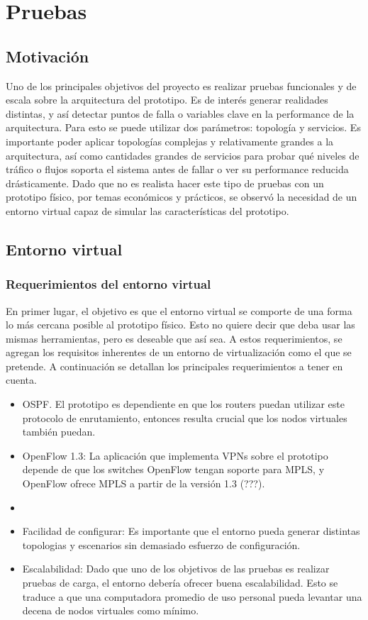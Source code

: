 \documentclass[a4paper,12pt]{report}
\begin{document}
\tableofcontents
\chapter{Pruebas}
\section{Motivación}
Uno de los principales objetivos del proyecto es realizar pruebas funcionales y de escala sobre la arquitectura del prototipo. Es de interés generar realidades distintas, y así detectar puntos de falla o variables clave en la performance de la arquitectura. Para esto se puede utilizar dos parámetros: topología y servicios. Es importante poder aplicar topologías complejas y relativamente grandes a la arquitectura, así como cantidades grandes de servicios para probar qué niveles de tráfico o flujos soporta el sistema antes de fallar o ver su performance reducida drásticamente. Dado que no es realista hacer este tipo de pruebas con un prototipo físico, por temas económicos y prácticos, se observó la necesidad de un entorno virtual capaz de simular las características del prototipo.

\section{Entorno virtual}
\subsection{Requerimientos del entorno virtual}
En primer lugar, el objetivo es que el entorno virtual se comporte de una forma lo más cercana posible al prototipo físico. Esto no quiere decir que deba usar las mismas herramientas, pero es deseable que así sea. A estos requerimientos, se agregan los requisitos inherentes de un entorno de virtualización como el que se pretende. A continuación se detallan los principales requerimientos a tener en cuenta.
\begin{itemize} 
	\item OSPF. El prototipo es dependiente en que los routers puedan utilizar este protocolo de enrutamiento, entonces resulta crucial que los nodos virtuales también puedan.
	\item OpenFlow 1.3: La aplicación que implementa VPNs sobre el prototipo depende de que los switches OpenFlow tengan soporte para MPLS, y OpenFlow ofrece MPLS a partir de la versión 1.3 (???).
	\item 
	\item Facilidad de configurar: Es importante que el entorno pueda generar distintas topologias y escenarios sin demasiado esfuerzo de configuración.
	\item Escalabilidad: Dado que uno de los objetivos de las pruebas es realizar pruebas de carga, el entorno debería ofrecer buena escalabilidad. Esto se traduce a que una computadora promedio de uso personal pueda levantar una decena de nodos virtuales como mínimo.
\end{itemize}
\end{document}
